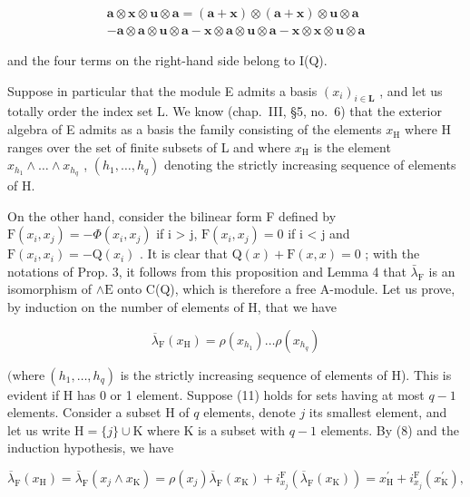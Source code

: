 \[
\begin{array}{c} \boldsymbol {a} \otimes \boldsymbol {x} \otimes \boldsymbol {u} \otimes \boldsymbol {a} = (\boldsymbol {a} + \boldsymbol {x}) \otimes (\boldsymbol {a} + \boldsymbol {x}) \otimes \boldsymbol {u} \otimes \boldsymbol {a} \\ - \boldsymbol {a} \otimes \boldsymbol {a} \otimes \boldsymbol {u} \otimes \boldsymbol {a} - \boldsymbol {x} \otimes \boldsymbol {a} \otimes \boldsymbol {u} \otimes \boldsymbol {a} - \boldsymbol {x} \otimes \boldsymbol {x} \otimes \boldsymbol {u} \otimes \boldsymbol {a} \end{array}
\]

and the four terms on the right-hand side belong to I(Q).

Suppose in particular that the module E admits a basis \((x_{i})_{i\in \mathbf{L}}\) , and let us totally order the index set L. We know (chap.~III, §5, no.~6) that the exterior algebra of E admits as a basis the family consisting of the elements \(x_{\mathrm{H}}\) where H ranges over the set of finite subsets of L and where \(x_{\mathrm{H}}\) is the element \(x_{h_1}\wedge \ldots \wedge x_{h_q}\) , \((h_1,\ldots ,h_q)\) denoting the strictly increasing sequence of elements of H.

On the other hand, consider the bilinear form F defined by \(\mathrm{F}(x_{i}, x_{j}) = -\Phi(x_{i}, x_{j})\) if i \textgreater{} j, \(\mathrm{F}(x_{i}, x_{j}) = 0\) if i \textless{} j and \(\mathrm{F}(x_{i}, x_{i}) = -\mathrm{Q}(x_{i})\) . It is clear that \(\mathrm{Q}(x) + \mathrm{F}(x, x) = 0\) ; with the notations of Prop. 3, it follows from this proposition and Lemma 4 that \(\bar{\lambda}_{\mathrm{F}}\) is an isomorphism of \(\wedge \mathrm{E}\) onto C(Q), which is therefore a free A-module. Let us prove, by induction on the number of elements of H, that we have

\[
\overline {{{{\lambda}}}} _ {\mathrm{F}} (x _ {\mathrm{H}}) = \rho (x _ {h _ {1}}) \dots \rho (x _ {h _ {q}})\tag{11}
\]

\((\mathrm{where}\ (h_{1},\ldots,h_{q})\) is the strictly increasing sequence of elements of H). This is evident if H has 0 or 1 element. Suppose (11) holds for sets having at most \(q-1\) elements. Consider a subset H of \(q\) elements, denote \(j\) its smallest element, and let us write \(\mathrm{H}=\{j\}\cup\mathrm{K}\) where K is a subset with \(q-1\) elements. By (8) and the induction hypothesis, we have

\[
\overline {{{\lambda}}} _ {\mathrm{F}} (x _ {\mathrm{H}}) = \overline {{{\lambda}}} _ {\mathrm{F}} (x _ {j} \wedge x _ {\mathrm{K}}) = \rho (x _ {j}) \overline {{{\lambda}}} _ {\mathrm{F}} (x _ {\mathrm{K}}) + i _ {x _ {j}} ^ {\mathrm{F}} (\overline {{{\lambda}}} _ {\mathrm{F}} (x _ {\mathrm{K}})) = x _ {\mathrm{H}} ^ {\prime} + i _ {x _ {j}} ^ {\mathrm{F}} (x _ {\mathrm{K}} ^ {\prime}),
\]

